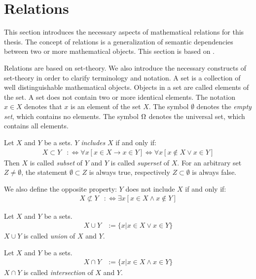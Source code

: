 \section{Relations}
This section introduces the necessary aspects of mathematical relations for this thesis.
The concept of relations is a generalization of semantic dependencies between two or more mathematical objects.
This section is based on \cite{DBLP:books/sp/SchmidtS89}.

Relations are based on set-theory. We also introduce the necessary constructs of set-theory in order to clarify terminology and notation.
A set is a collection of well distinguishable mathematical objects.
Objects in a set are called elements of the set.
A set does not contain two or more identical elements.
The notation $x \in X$ denotes that $x$ is an element of the set $X$.
The symbol $\emptyset$ denotes the \emph{empty set}, which contains no elements.
The symbol $\Omega$ denotes the universal set, which contains all elements.

\begin{definition}[Inclusion]
\label{definition:Inclusion}
Let $X$ and $Y$ be a sets.
$Y$ \emph{includes} $X$ if and only if:
\begin{align}
X \subset Y 
&:\Leftrightarrow \forall x [x \in X \rightarrow x \in Y]
\Leftrightarrow \forall x [x \not\in X \vee x \in Y ]
\end{align}
Then $X$ is called \emph{subset} of $Y$ and $Y$ is called \emph{superset} of $X$.
For an arbitrary set $Z \neq \emptyset$, the statement $\emptyset \subset Z$ is always true, respectively $Z \subset \emptyset$ is always false.
\end{definition}
We also define the opposite property: $Y$ does not include $X$ if and only if:
\begin{align}
X \not\subset Y
&:\Leftrightarrow \exists x [x \in X \wedge x \not\in Y]
\end{align}

\begin{definition}[Union]
Let $X$ and $Y$ be a sets.
\begin{align}
X \cup Y &:= \{ x | x \in X \vee x \in Y \} 
\end{align}
$X \cup Y$ is called \emph{union} of $X$ and $Y$.
\end{definition}

\begin{definition}[Intersection]
Let $X$ and $Y$ be a sets.
\begin{align}
X \cap Y &:= \{ x | x \in X \wedge x \in Y \} 
\end{align}
$X \cap Y$ is called \emph{intersection} of $X$ and $Y$.
\end{definition}

